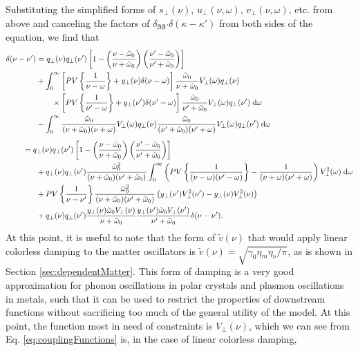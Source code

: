 \documentclass{article}
\begin{document}
Substituting the simplified forms of $s_\perp(\nu)$, $u_\perp(\nu,\omega)$, $v_\perp(\nu,\omega)$, etc. from above and canceling the factors of $\delta_{\bm{\beta}\bm{\beta}'}\delta(\kappa - \kappa')$ from both sides of the equation, we find that
\begin{equation}\label{eq:transversePrefactorAlgebra1}
\begin{split}
\delta(\nu - \nu') &= q_\perp(\nu)q_\perp(\nu')\left[1 - \left(\frac{\nu - \tilde{\omega}_0}{\nu + \tilde{\omega}_0}\right)\left(\frac{\nu' - \tilde{\omega}_0}{\nu' + \tilde{\omega}_0}\right)\right]\\
& + \int_0^\infty\left[PV\left\{\frac{1}{\nu - \omega}\right\} + y_\perp(\nu)\delta(\nu - \omega)\right]\frac{\tilde{\omega}_0}{\nu + \tilde{\omega}_0}V_\perp(\omega)q_\perp(\nu)\\
&\qquad\times\left[PV\left\{\frac{1}{\nu' - \omega}\right\} + y_\perp(\nu')\delta(\nu' - \omega)\right]\frac{\tilde{\omega}_0}{\nu' + \tilde{\omega}_0}V_\perp(\omega)q_\perp(\nu')\;\mathrm{d}\omega\\
& - \int_0^\infty\frac{\tilde{\omega}_0}{(\nu + \tilde{\omega}_0)(\nu + \omega)}V_\perp(\omega)q_\perp(\nu)\frac{\tilde{\omega}_0}{(\nu' + \tilde{\omega}_0)(\nu' + \omega)}V_\perp(\omega)q_\perp(\nu')\;\mathrm{d}\omega\\[0.5em]
&\hspace{-0.05\textwidth}= q_\perp(\nu)q_\perp(\nu')\left[1 - \left(\frac{\nu - \tilde{\omega}_0}{\nu + \tilde{\omega}_0}\right)\left(\frac{\nu' - \tilde{\omega}_0}{\nu' + \tilde{\omega}_0}\right)\right]\\
&+ q_\perp(\nu)q_\perp(\nu')\frac{\tilde{\omega}_0^2}{(\nu + \tilde{\omega}_0)(\nu' + \tilde{\omega}_0)}\int_0^\infty\left(PV\left\{\frac{1}{(\nu - \omega)(\nu' - \omega)}\right\} - \frac{1}{(\nu + \omega)(\nu' + \omega)}\right)V_\perp^2(\omega)\;\mathrm{d}\omega\\
& + PV\left\{\frac{1}{\nu - \nu'}\right\}\frac{\tilde{\omega}_0^2}{(\nu + \tilde{\omega}_0)(\nu' + \tilde{\omega}_0)}\left(y_\perp(\nu')V_\perp^2(\nu') - y_\perp(\nu)V_\perp^2(\nu)\right)\\
& + q_\perp(\nu)q_\perp(\nu')\frac{y_\perp(\nu)\tilde{\omega}_0V_\perp(\nu)}{\nu + \tilde{\omega}_0}\frac{y_\perp(\nu')\tilde{\omega}_0V_\perp(\nu')}{\nu' + \tilde{\omega}_0}\delta(\nu - \nu').
\end{split}
\end{equation}
At this point, it is useful to note that the form of $\tilde{v}(\nu)$ that would apply linear colorless damping to the matter oscillators is $\tilde{v}(\nu) = \sqrt{\gamma_0\eta_m\eta_\nu/\pi}$, as is shown in Section \ref{sec:dependentMatter}. This form of damping is a very good approximation for phonon oscillations in polar crystals and plasmon oscillations in metals, such that it can be used to restrict the properties of downstream functions without sacrificing too much of the general utility of the model. At this point, the function most in need of constraints is $V_\perp(\nu)$, which we can see from Eq. \eqref{eq:couplingFunctions} is, in the case of linear colorless damping,
\end{document}
